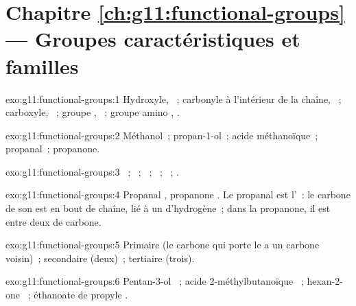 \section*{Chapitre \ref{ch:g11:functional-groups} --- Groupes caractéristiques et familles}

\begin{solution}{exo:g11:functional-groups:1}
Hydroxyle, ~; carbonyle à l'intérieur de la chaîne, ~;
carboxyle, ~; groupe , ~; groupe amino
, .
\end{solution}

\begin{solution}{exo:g11:functional-groups:2}
Méthanol~; propan-1-ol~; acide méthanoïque~; propanal~; propanone.
\end{solution}

\begin{solution}{exo:g11:functional-groups:3}
~; ~; ~; ~; ~; .
\end{solution}

\begin{solution}{exo:g11:functional-groups:4}
Propanal , propanone . Le propanal est
l'~: le carbone de son  est en bout de chaîne, lié à un
 d'hydrogène~; dans la propanone, il est entre deux  de
carbone.
\end{solution}

\begin{solution}{exo:g11:functional-groups:5}
Primaire (le carbone qui porte le  a un carbone voisin)~;
secondaire (deux)~; tertiaire (trois).
\end{solution}

\begin{solution}{exo:g11:functional-groups:6}
Pentan-3-ol ~;
acide 2-méthylbutanoïque ~;
hexan-2-one ~;
éthanoate de propyle .
\end{solution}

